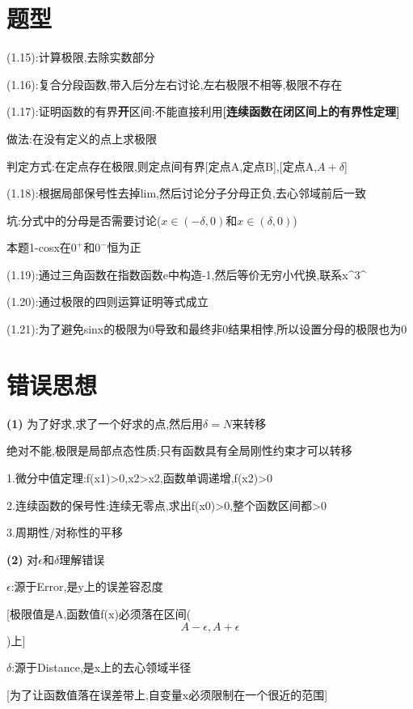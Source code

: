 \documentclass[11pt,a4paper,UTF8]{ctexart}
\begin{document}
\section{题型}

(1.15):计算极限,去除实数部分

(1.16):复合分段函数,带入后分左右讨论,左右极限不相等,极限不存在

(1.17):证明函数的有界\textbf{开}区间:不能直接利用\textbf{[连续函数在闭区间上的有界性定理]}

\begin{solbox}[{分步推导与答题规范}]
  做法:在没有定义的点上求极限

  判定方式:在定点存在极限,则定点间有界[定点A,定点B],[定点A,$A+\delta$]
\end{solbox}

(1.18):根据局部保号性去掉lim,然后讨论分子分母正负,去心邻域前后一致

\begin{solbox}[{分步推导与答题规范}]
  \textit{}坑:分式中的分母是否需要讨论($x \in (-\delta, 0)$和$x \in (\delta, 0)$)\textit{}

  本题1-cosx在$0^+$和$0^-$恒为正
\end{solbox}

(1.19):通过三角函数在指数函数e中构造-1,然后等价无穷小代换,联系x\textasciicircum{}3\textasciicircum{}

(1.20):通过极限的四则运算证明等式成立

(1.21):为了避免sinx的极限为0导致和最终非0结果相悖,所以设置分母的极限也为0


\section{错误思想}

\textbf{(1)} 为了好求,求了一个好求的点,然后用$\delta=N$来转移

\begin{solbox}[{分步推导与答题规范}]
绝对不能,极限是局部点态性质;只有函数具有全局刚性约束才可以转移

1.微分中值定理:f(x1)>0,x2>x2,函数单调递增,f(x2)>0

2.连续函数的保号性:连续无零点,求出f(x0)>0,整个函数区间都>0

3.周期性/对称性的平移
\end{solbox}

\textbf{(2)} 对$\epsilon$和$\delta$理解错误

\begin{solbox}[{分步推导与答题规范}]
  $\epsilon$:源于Error,是y上的误差容忍度	

  [极限值是A,函数值f(x)必须落在区间(
\begin{equation*}
A-\epsilon,A+\epsilon
\end{equation*}
)上]

  $\delta$:源于Distance,是x上的去心领域半径

  [为了让函数值落在误差带上,自变量x必须限制在一个很近的范围]
\end{solbox}
\end{document}
